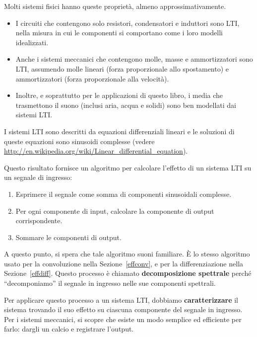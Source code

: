 \documentclass[12pt,a4paper]{book}
\begin{document}
Molti sistemi fisici hanno queste proprietà, almeno approssimativamente.

\begin{itemize} 

\item I circuiti che contengono solo resistori, condensatori e induttori sono LTI, nella misura in cui le componenti si comportano come i loro modelli idealizzati.

\item Anche i sistemi meccanici che contengono molle, masse e ammortizzatori sono LTI, assumendo molle lineari (forza proporzionale allo spostamento) e ammortizzatori (forza proporzionale alla velocità).

\item Inoltre, e soprattutto per le applicazioni di questo libro, i media che trasmettono il suono (inclusi aria, acqua e solidi) sono ben modellati dai sistemi LTI.

\end{itemize} 

I sistemi LTI sono descritti da equazioni differenziali lineari e le soluzioni di queste equazioni sono sinusoidi complesse (vedere \url{http://en.wikipedia.org/wiki/Linear_differential_equation}).

Questo risultato fornisce un algoritmo per calcolare l'effetto di un sistema LTI su un segnale di ingresso:

\begin{enumerate} 

\item Esprimere il segnale come somma di componenti sinusoidali complesse.

\item Per ogni componente di input, calcolare la componente di output corrispondente.

\item Sommare le componenti di output.

\end{enumerate} 

A questo punto, si spera che tale algoritmo suoni familiare. È lo stesso algoritmo usato per la convoluzione nella Sezione~\ref{effconv}, e per la differenziazione nella Sezione~\ref{effdiff}. Questo processo è chiamato {\bf decomposizione spettrale} perché ``decomponiamo'' il segnale in ingresso nelle sue componenti spettrali.

Per applicare questo processo a un sistema LTI, dobbiamo {\bf caratterizzare} il sistema trovando il suo effetto su ciascuna componente del segnale in ingresso. Per i sistemi meccanici, si scopre che esiste un modo semplice ed efficiente per farlo: dargli un calcio e registrare l'output.
\end{document}
